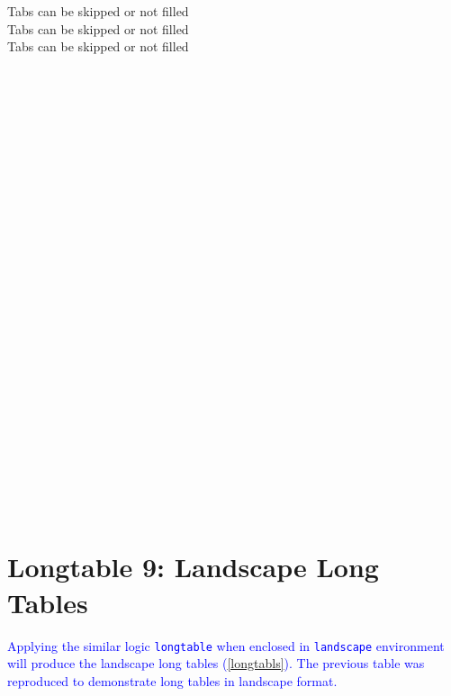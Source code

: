 \documentclass[phd]{ndsu-thesis-2022}
\newcommand\italk[1]{\textcolor{blue}{#1}}  %
\begin{document}
\begin{tabbing}
\>Tabs can be skipped or not filled\\ 
\>\>Tabs can be skipped or not filled\\ 
\>\>\>Tabs can be skipped or not filled\\ 
    \\
    \\
    \\
    \\
    \\
    \\
    \\
    \\
    \\
    \\
    \\
    \\
    \\
    \\
    \\
    \\
    \\
    \\
    \\
    \\
    \\
    \\
    \\
    \\
    \\
    \\
\end{tabbing}
\endgroup

\vspace{-4ex}
\kant[9]

\section{Longtable 9: Landscape Long Tables}
\italk{Applying the similar logic \texttt{longtable} when enclosed in \texttt{landscape} environment will produce the landscape long tables (\cref{longtabls}). The previous table was reproduced to demonstrate long tables in landscape format.}
\end{document}
